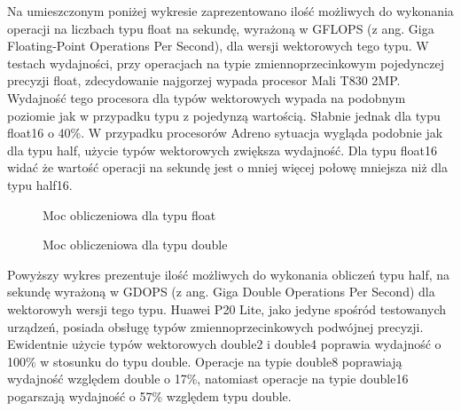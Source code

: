 Na umieszczonym poniżej wykresie zaprezentowano ilość możliwych do wykonania operacji na liczbach typu float na sekundę, wyrażoną w GFLOPS (z ang. Giga Floating-Point Operations Per Second), dla wersji wektorowych tego typu. W testach wydajności, przy operacjach na typie zmiennoprzecinkowym pojedynczej precyzji float, zdecydowanie najgorzej wypada procesor Mali T830 2MP. Wydajność tego procesora dla typów wektorowych wypada na podobnym poziomie jak w przypadku typu z pojedynzą wartością. Słabnie jednak dla typu float16 o 40\%. W przypadku procesorów Adreno sytuacja wygląda podobnie jak dla typu half, użycie typów wektorowych zwiększa wydajność. Dla typu float16 widać że wartość operacji na sekundę jest o mniej więcej połowę mniejsza niż dla typu half16.
\begin{figure}[H]
\caption{Moc obliczeniowa dla typu float}
\end{figure}

\begin{figure}[H]
\caption{Moc obliczeniowa dla typu double}
\end{figure}
Powyższy wykres prezentuje ilość możliwych do wykonania obliczeń typu half, na sekundę wyrażoną w GDOPS (z ang. Giga Double Operations Per Second) dla wektorowyh wersji tego typu. Huawei P20 Lite, jako jedyne spośród testowanych urządzeń, posiada obsługę typów zmiennoprzecinkowych podwójnej precyzji. Ewidentnie użycie typów wektorowych double2 i double4 poprawia wydajność o 100\% w stosunku do typu double. Operacje na typie double8 poprawiają wydajność względem double o 17\%, natomiast operacje na typie double16 pogarszają wydajność o 57\% względem typu double.

